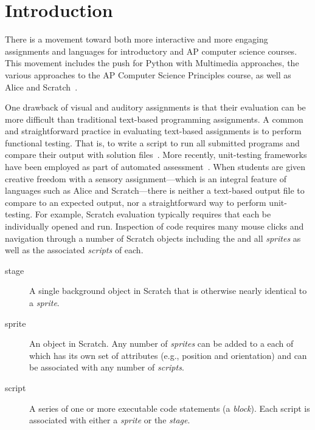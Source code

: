 \section{Introduction}
There is a movement toward both more interactive and more engaging assignments
and languages for introductory and AP computer science courses. This movement
includes the push for Python with Multimedia approaches, the various approaches
to the AP Computer Science Principles course, as well as Alice and
Scratch~\cite{Adams:2012:SLP:2157136.2157319, Forte:2004:CCC:962752.962945,
  Simon:2010:ERC:1822090.1822151, Snyder:2012:FFC:2189835.2189852,
  Cooper:2003:TOI:611892.611966, Maloney:2010:SPL:1868358.1868363}.

One drawback of visual and auditory assignments is that their evaluation can be
more difficult than traditional text-based programming assignments.  A common
and straightforward practice in evaluating text-based assignments is to perform
functional testing. That is, to write a script to run all submitted programs
and compare their output with solution
files~\cite{Jackson:1997:GSP:268084.268210}.  More recently, unit-testing
frameworks have been employed as part of automated
assessment~\cite{Spacco:2006:EMD:1140124.1140131,
  Edwards:2003:RCS:949344.949390}.  When students are given creative freedom
with a sensory assignment---which is an integral feature of languages such as
Alice and Scratch---there is neither a text-based output file to compare to an
expected output, nor a straightforward way to perform unit-testing.  For
example, Scratch evaluation typically requires that each \sprogram{} be
individually opened and run.  Inspection of \sprogram{} code requires many
mouse clicks and navigation through a number of Scratch objects including the
\stage{} and all \emph{sprites} as well as the associated \emph{scripts} of
each.

\begin{description}
\item[stage] A single background object in Scratch that is otherwise nearly
  identical to a \emph{sprite}.
\item[sprite] An object in Scratch. Any number of \emph{sprites} can be added
  to a \sprogram{} each of which has its own set of attributes (e.g., position
  and orientation) and can be associated with any number of \emph{scripts}.
\item[script] A series of one or more executable code statements (a
  \emph{block}). Each script is associated with either a \emph{sprite} or the
  \emph{stage}.
\end{description}

